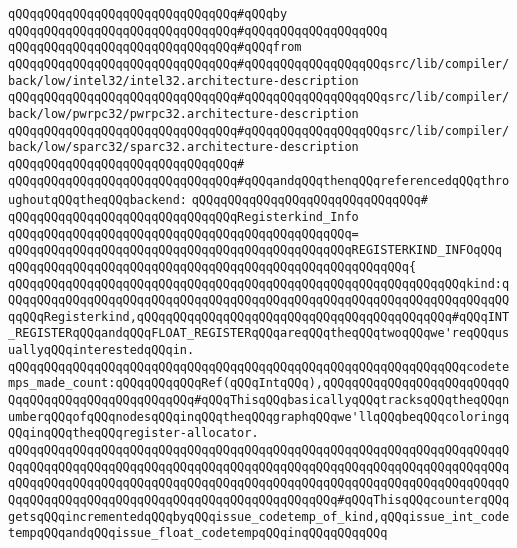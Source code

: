 \verb|qQQqqQQqqQQqqQQqqQQqqQQqqQQqqQQq#qQQqby|\newline
\verb|qQQqqQQqqQQqqQQqqQQqqQQqqQQqqQQq#qQQqqQQqqQQqqQQqqQQq|\newline
\verb|qQQqqQQqqQQqqQQqqQQqqQQqqQQqqQQq#qQQqfrom|\newline
\verb|qQQqqQQqqQQqqQQqqQQqqQQqqQQqqQQq#qQQqqQQqqQQqqQQqqQQqsrc/lib/compiler/back/low/intel32/intel32.architecture-description|\newline
\verb|qQQqqQQqqQQqqQQqqQQqqQQqqQQqqQQq#qQQqqQQqqQQqqQQqqQQqsrc/lib/compiler/back/low/pwrpc32/pwrpc32.architecture-description|\newline
\verb|qQQqqQQqqQQqqQQqqQQqqQQqqQQqqQQq#qQQqqQQqqQQqqQQqqQQqsrc/lib/compiler/back/low/sparc32/sparc32.architecture-description|\newline
\verb|qQQqqQQqqQQqqQQqqQQqqQQqqQQqqQQq#|\newline
\verb|qQQqqQQqqQQqqQQqqQQqqQQqqQQqqQQq#qQQqandqQQqthenqQQqreferencedqQQqthroughoutqQQqtheqQQqbackend:|\newline
\verb|qQQqqQQqqQQqqQQqqQQqqQQqqQQqqQQq#|\newline
\verb|qQQqqQQqqQQqqQQqqQQqqQQqqQQqqQQqRegisterkind_Info|\newline
\verb|qQQqqQQqqQQqqQQqqQQqqQQqqQQqqQQqqQQqqQQqqQQqqQQq=|\newline
\verb|qQQqqQQqqQQqqQQqqQQqqQQqqQQqqQQqqQQqqQQqqQQqqQQqREGISTERKIND_INFOqQQq|\newline
\verb|qQQqqQQqqQQqqQQqqQQqqQQqqQQqqQQqqQQqqQQqqQQqqQQqqQQqqQQq{|\newline
\verb|qQQqqQQqqQQqqQQqqQQqqQQqqQQqqQQqqQQqqQQqqQQqqQQqqQQqqQQqqQQqqQQqkind:qQQqqQQqqQQqqQQqqQQqqQQqqQQqqQQqqQQqqQQqqQQqqQQqqQQqqQQqqQQqqQQqqQQqqQQqqQQqRegisterkind,qQQqqQQqqQQqqQQqqQQqqQQqqQQqqQQqqQQqqQQqqQQq#qQQqINT_REGISTERqQQqandqQQqFLOAT_REGISTERqQQqareqQQqtheqQQqtwoqQQqwe'reqQQqusuallyqQQqinterestedqQQqin.|\newline
\newline
\verb|qQQqqQQqqQQqqQQqqQQqqQQqqQQqqQQqqQQqqQQqqQQqqQQqqQQqqQQqqQQqqQQqcodetemps_made_count:qQQqqQQqqQQqRef(qQQqIntqQQq),qQQqqQQqqQQqqQQqqQQqqQQqqQQqqQQqqQQqqQQqqQQqqQQqqQQq#qQQqThisqQQqbasicallyqQQqtracksqQQqtheqQQqnumberqQQqofqQQqnodesqQQqinqQQqtheqQQqgraphqQQqwe'llqQQqbeqQQqcoloringqQQqinqQQqtheqQQqregister-allocator.|\newline
\verb|qQQqqQQqqQQqqQQqqQQqqQQqqQQqqQQqqQQqqQQqqQQqqQQqqQQqqQQqqQQqqQQqqQQqqQQqqQQqqQQqqQQqqQQqqQQqqQQqqQQqqQQqqQQqqQQqqQQqqQQqqQQqqQQqqQQqqQQqqQQqqQQqqQQqqQQqqQQqqQQqqQQqqQQqqQQqqQQqqQQqqQQqqQQqqQQqqQQqqQQqqQQqqQQqqQQqqQQqqQQqqQQqqQQqqQQqqQQqqQQqqQQqqQQqqQQqqQQq#qQQqThisqQQqcounterqQQqgetsqQQqincrementedqQQqbyqQQqissue_codetemp_of_kind,qQQqissue_int_codetempqQQqandqQQqissue_float_codetempqQQqinqQQqqQQqqQQq|\newline
